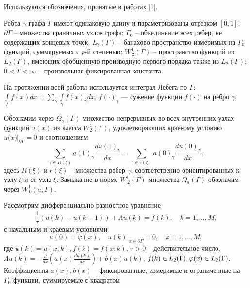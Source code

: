 \vzmscaption


Используются обозначения, принятые в работах [1].

Ребра $ \gamma $ графа $ \Gamma $ имеют одинаковую длину и параметризованы отрезком $[0,1]$; $ \partial \Gamma $ -- множества граничных узлов графа; $ {{\Gamma }_{0}} $ -- объединение всех ребер, не содержащих концевых точек; $L_{2}(\Gamma)$ -- банахово пространство измеримых на $\Gamma_0$ функций, суммируемых с $p$-й степенью; $W_{\,2}^{1}(\Gamma)$ -- пространство функций из $L_{2}(\Gamma)$, имеющих обобщенную производную первого порядка также из $L_{2}(\Gamma)$; $ 0<T<\infty $ -- произвольная фиксированная константа.

На протяжении всей работы используется интеграл Лебега по $\Gamma$: $\int\limits_{\Gamma}f(x)dx=\sum\limits_{\gamma}\int\limits_{\gamma}f(x)_\gamma dx$, $f(\cdot)_\gamma$ --- сужение функции $f(\cdot)$ на ребро $\gamma$.

Обозначим через $ {{\Omega }_{a}}(\Gamma ) $ множество непрерывных во всех внутренних узлах функций $ u(x) $ из класса $ W_{2}^{1}(\Gamma ) $, удовлетворяющих краевому условию $ u(x{{)|}_{\partial \Gamma }}=0 $ и соотношениям 
\begin{equation*}{
\sum\limits_{\gamma \in R(\xi )}{}a{{(1)}_{\gamma }}\frac{du{{(1)}_{\gamma }}}{dx}=\sum\limits_{\gamma \in r(\xi )}{}a{{(0)}_{\gamma }}\frac{du{{(0)}_{\gamma }}}{dx},}
\end{equation*}
здесь $R(\xi)$ и $r(\xi)$ -- множества ребер $\gamma$, соответственно ориентированных к узлу $\xi$ и от узла $\xi$. Замыкание в норме $W^1_{\,2}(\Gamma)$ множества $\Omega_a(\Gamma)$ обозначим через $W^1_{\,0}(a,\Gamma)$.

Рассмотрим дифференциально-разностное уравнение
\begin{equation}{
	\frac{1}{\tau}(u(k)-u(k-1))+\Lambda u(k)=f(k),\quad k=1,\ldots,M,
}
\end{equation}
с начальным и краевым условиями
\begin{equation}{
	u(0)=\varphi (x),\quad u(k){{|}_{x\in \partial \Gamma }}=0,\quad k=1,\ldots,M, 	
}
\end{equation}
где $ u(k)=u(x;k), f(k)=f(x;k) $, $ \tau>0 $ -- действительное число, $ \Lambda u(k)=-\frac{d}{dx}\left( a(x)\frac{du(k)}{dx} \right)+b(x)u(k) $, $f(k)\in L_2(\Gamma),\quad \\\varphi (x)\in L_2(\Gamma)$. Коэффициенты $ a(x),b(x) $ -- фиксированные, измеримые и ограниченные на $ {{\Gamma }_{0}} $ функции, суммируемые с квадратом
 
